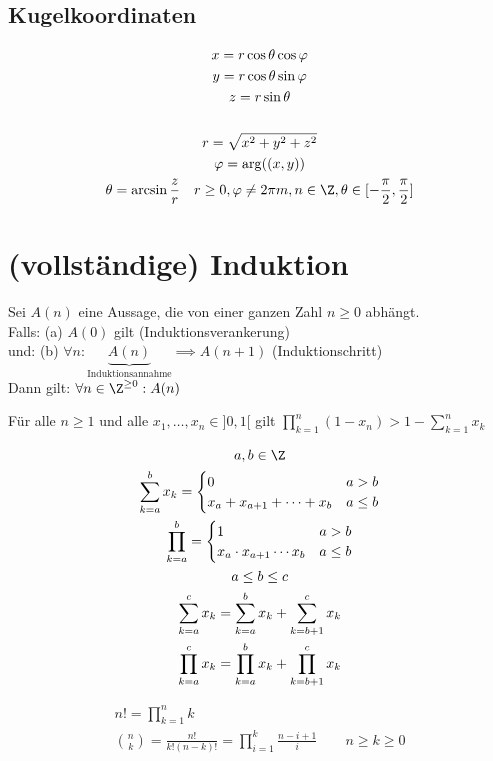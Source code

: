 \subsection{Kugelkoordinaten}
\begin{gather*}
	x = r \cos \theta \cos \varphi \\
	y = r \cos \theta \sin \varphi \\
	z = r \sin \theta \\
	\\
	r = \sqrt{x^2 + y^2 + z^2} \\
	\varphi = \arg((x,y)) \\
	\theta = \arcsin \frac{z}{r} \quad r \geq 0 , \varphi \neq 2\pi m , n \in \Z , \theta \in [ -\frac{\pi}{2} , \frac{\pi}{2} ]
\end{gather*}

\section{(vollständige) Induktion}
Sei $A(n)$ eine Aussage, die von einer ganzen Zahl $n \geq 0$ abhängt.\\
Falls: (a) $A(0)$ gilt (Induktionsverankerung) \\
und: (b) $\forall n : \underbrace{A(n)}_{\text{Induktionsannahme}} \implies A(n+1)$ (Induktionschritt) \\
Dann gilt: $\forall n \in \Z^{\geq 0} : A(n)$\\
\begin{satz*}
	Für alle $n \geq 1$ und alle $x_1, \dotsc , x_n \in ]0,1[$ gilt $\prod_{k=1}^n (1-x_n) > 1 - \sum_{k=1}^n x_k$\\
	\begin{bem}[note = Erinnerung]
		\begin{gather*}
			a, b \in \Z \\
			\sum_{k=a}^b x_k = \begin{cases}
				0						&a > b	\\
				x_a + x_{a+1} + \dots + x_b	&a \leq b	
			\end{cases} \\
			\prod_{k=a}^b = \begin{cases}
				1						&a > b	\\
				x_a \cdot x_{a+1} \dotsm x_b	&a \leq b
			\end{cases}\\
			a \leq b \leq c \\
			\sum_{k=a}^c x_k = \sum_{k=a}^b x_k + \sum_{k=b+1}^c x_k \\
			\prod_{k=a}^c x_k = \prod_{k=a}^b x_k + \prod_{k=b+1}^c x_k
		\end{gather*}
	\end{bem}
	\begin{bsp*}
		\begin{gather*}
			n! = \prod_{k=1}^n k \\
			\binom{n}{k} = \frac{n!}{k!(n-k)!} = \prod_{i=1}^k \frac{n-i+1}{i} \qquad n \geq k \geq 0
		\end{gather*}
	\end{bsp*}
\end{satz*}
